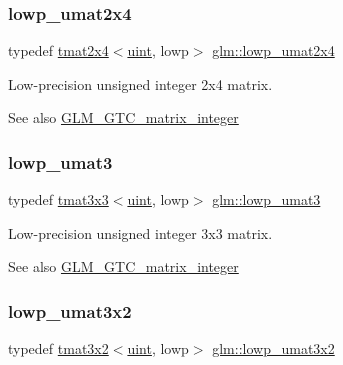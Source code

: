 \subsubsection{\texorpdfstring{lowp\+\_\+umat2x4}{lowp\_umat2x4}}
{\footnotesize\ttfamily typedef \hyperlink{structglm_1_1tmat2x4}{tmat2x4}$<$\hyperlink{group__core__precision_ga4fd29415871152bfb5abd588334147c8}{uint}, lowp$>$ \hyperlink{group__gtc__matrix__integer_gad5e8f08c103d5dd33767e31938357aa6}{glm\+::lowp\+\_\+umat2x4}}

Low-\/precision unsigned integer 2x4 matrix. \begin{DoxySeeAlso}{See also}
\hyperlink{group__gtc__matrix__integer}{G\+L\+M\+\_\+\+G\+T\+C\+\_\+matrix\+\_\+integer} 
\end{DoxySeeAlso}
\mbox{\label{group__gtc__matrix__integer_ga71b66cc4f5e2d30b64ec99425562a6b6}} 
\subsubsection{\texorpdfstring{lowp\+\_\+umat3}{lowp\_umat3}}
{\footnotesize\ttfamily typedef \hyperlink{structglm_1_1tmat3x3}{tmat3x3}$<$\hyperlink{group__core__precision_ga4fd29415871152bfb5abd588334147c8}{uint}, lowp$>$ \hyperlink{group__gtc__matrix__integer_ga71b66cc4f5e2d30b64ec99425562a6b6}{glm\+::lowp\+\_\+umat3}}

Low-\/precision unsigned integer 3x3 matrix. \begin{DoxySeeAlso}{See also}
\hyperlink{group__gtc__matrix__integer}{G\+L\+M\+\_\+\+G\+T\+C\+\_\+matrix\+\_\+integer} 
\end{DoxySeeAlso}
\mbox{\label{group__gtc__matrix__integer_ga3ea8482ddaa10befe8dc2d681d86bb59}} 
\subsubsection{\texorpdfstring{lowp\+\_\+umat3x2}{lowp\_umat3x2}}
{\footnotesize\ttfamily typedef \hyperlink{structglm_1_1tmat3x2}{tmat3x2}$<$\hyperlink{group__core__precision_ga4fd29415871152bfb5abd588334147c8}{uint}, lowp$>$ \hyperlink{group__gtc__matrix__integer_ga3ea8482ddaa10befe8dc2d681d86bb59}{glm\+::lowp\+\_\+umat3x2}}


